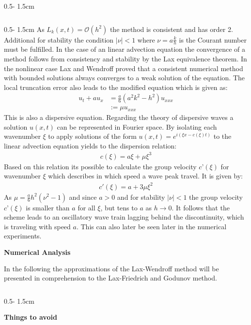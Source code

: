 \documentclass{uibposter}
\begin{document}
\begin{frame}[fragile]
\begin{columns}
\begin{column}{0.5\textwidth - 1.5cm}
\begin{column}{0.5\textwidth - 1.5cm}
As $L_k(x,t) = \mathcal{O}(h^2)$ the method is consistent and has order 2. Additional for stability the condition $|\nu| < 1$ where $\nu = a\frac{k}{h}$ is the Courant number must be fulfilled. 
In the case of an linear advection equation the convergence of a method follows from consistency and stability by the Lax equivalence theorem. In the nonlinear case Lax and Wendroff proved that a consistent numerical method with bounded solutions always converges to a weak solution of the equation.
The local truncation error also leads to the modified equation which is given as:
\begin{align*}
u_t + a u_x &= \frac{a}{6} (a^2 k^2 - h^2) u_{xxx}\\
&:= \mu u_{xxx}
\end{align*}
This is also a dispersive equation. Regarding the theory of dispersive waves a solution $u(x, t)$ can be represented in Fourier space. By isolating each wavenumber $\xi$ to apply solutions of the form $u(x,t) = e^{i(\xi x - c(\xi)t)}$ to the linear advection equation yields to the dispersion relation:
\begin{align*}
c(\xi) = a\xi + \mu \xi^3
\end{align*}
Based on this relation its possible to calculate the group velocity $c’(\xi)$ for wavenumber $\xi$ which describes in which speed a wave peak travel. It is given by:
\begin{align*}
c'(\xi) = a + 3\mu \xi^2
\end{align*}
As $\mu = \frac{a}{6}h^2(\nu^2 - 1)$ and since $a > 0$ and for stability $|\nu| < 1$ the group velocity $c’(\xi)$ is smaller than $a$ for all $\xi$, but tens to $a$ as $h\rightarrow0$. It follows that the scheme leads to an oscillatory wave train lagging behind the discontinuity, which is traveling with speed $a$. This can also later be seen later in the numerical experiments.
    
\vspace{0.5cm}
\textbf{Numerical Analysis}
\vspace{0.5cm}
    
In the following the approximations of the Lax-Wendroff method will be presented in comprehension to the Lax-Friedrich and Godunov method.
    
\end{column}
\begin{column}{0.5\textwidth - 1.5cm}
\vspace*{-14.5cm}

    \textbf{Things to avoid}
\vspace{0.5cm}


\end{column}
\end{column}
\end{columns}
\end{frame}
\end{document}
